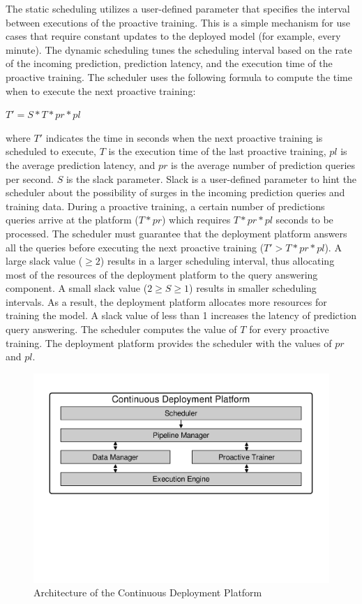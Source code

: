 The static scheduling utilizes a user-defined parameter that specifies the interval between executions of the proactive training.
This is a simple mechanism for use cases that require constant updates to the deployed model (for example, every minute).
The dynamic scheduling tunes the scheduling interval based on the rate of the incoming prediction, prediction latency, and the execution time of the proactive training.
The scheduler uses the following formula to compute the time when to execute the next proactive training:
\begin{center}
$T' = S * T * pr * pl$
\end{center}
where $T'$ indicates the time in seconds when the next proactive training is scheduled to execute, $T$ is the execution time of the last proactive training, $pl$ is the average prediction latency, and $pr$ is the average number of prediction queries per second.
$S$ is the slack parameter.
Slack is a user-defined parameter to hint the scheduler about the possibility of surges in the incoming prediction queries and training data.
During a proactive training, a certain number of predictions queries arrive at the platform ($T * pr$) which requires $T * pr * pl$ seconds to be processed.
The scheduler must guarantee that the deployment platform answers all the queries before executing the next proactive training ($T' > T * pr * pl$).
A large slack value ($\geq2$) results in a larger scheduling interval, thus allocating most of the resources of the deployment platform to the query answering component.
A small slack value ($2 \geq S \geq 1$) results in smaller scheduling intervals.
As a result, the deployment platform allocates more resources for training the model.
A slack value of less than 1 increases the latency of prediction query answering.
The scheduler computes the value of $T$ for every proactive training.
The deployment platform provides the scheduler with the values of $pr$ and $pl$. 

\begin{figure}[h]
\centering
\includegraphics[width=\columnwidth]{../images/system-architecture.pdf}
\caption{Architecture of the Continuous Deployment Platform}
\label{fig:system-architecture}
\end{figure}


